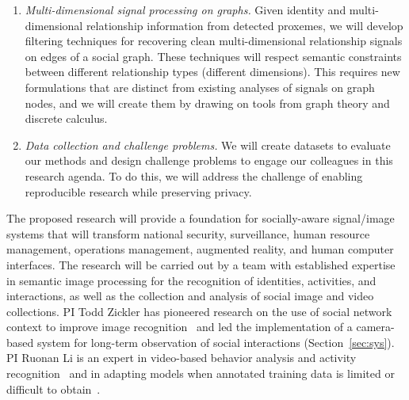 \begin{enumerate}
\vspace{-0.1in}\item \emph{Multi-dimensional signal processing on graphs.} Given identity and multi-dimensional relationship information from detected proxemes, we will develop filtering techniques for recovering clean multi-dimensional relationship signals on edges of a social graph. These techniques will respect semantic constraints between different relationship types (different dimensions). This requires new formulations that are distinct from existing analyses of signals on graph nodes, and we will create them by drawing on tools from graph theory and discrete calculus.


\vspace{-0.1in}\item \emph{Data collection and challenge problems.} We will create datasets to evaluate our methods and design challenge problems to engage our colleagues in this research agenda. To do this, we will address the challenge of enabling reproducible research while preserving privacy.

\end{enumerate}

\vspace{-5pt}
The proposed research will provide a foundation for socially-aware signal/image systems that will transform national security, surveillance, human resource management, operations management, augmented reality, and human computer interfaces. The research will be carried out by a team with established expertise in semantic image processing for the recognition of identities, activities, and interactions, as well as the collection and analysis of social image and video collections. PI Todd Zickler has pioneered research on the use of social network context to improve image recognition~\cite{Stone2008,Stone2010} and led the implementation of a camera-based system for long-term observation of social interactions (Section~\ref{sec:sys}). PI Ruonan Li is an expert in video-based behavior analysis and activity recognition~\cite{groupdet2013,LiIJCV2012,LiPAMI2012,Li2010} and in adapting models when annotated training data is limited or difficult to obtain~\cite{LiZickler2012,Li2011}. 







